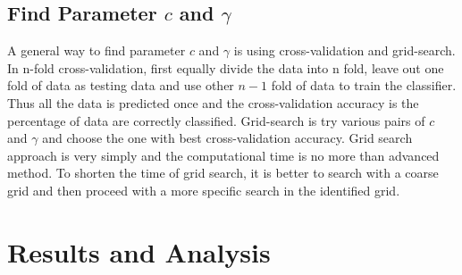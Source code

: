 \subsection{Find Parameter $c$ and $\gamma$}
A general way to find parameter $c$ and $\gamma$ is using cross-validation and grid-search.
In n-fold cross-validation, first equally divide the data into n fold, leave out one fold of data as testing data and use other $n-1$ fold of data to train the classifier. Thus all the data is predicted once and the cross-validation accuracy is the percentage of data are correctly classified. 
Grid-search is try various pairs of $c$ and $\gamma$ and choose the one with best cross-validation accuracy. Grid search approach is very simply and the computational time is no more than advanced method. To shorten the time of grid search, it is better to search with a coarse grid and then proceed with a more specific search in the identified grid.
\section{Results and Analysis}